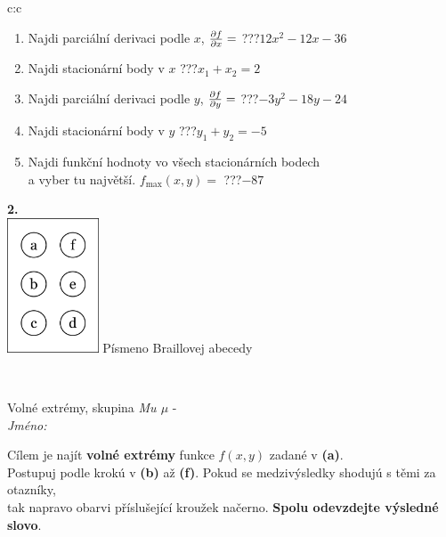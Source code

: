 \documentclass[10pt]{report}
\begin{document}
\begin{tabular}{c:c}
\begin{minipage}[c][104.5mm][t]{0.5\linewidth}
\begin{center}
\begin{minipage}{0.79\linewidth}
\begin{center}
\begin{varwidth}{\linewidth}
\begin{enumerate}
\item Najdi parciální derivaci podle $x$, $\pdv{f}{x}=$\quad \dotfill\; ???\;\dotfill \quad $12x^2-12x-36$
\item Najdi stacionární body v $x$\quad \dotfill\; ???\;\dotfill \quad $x_1+x_2=2$
\item Najdi parciální derivaci podle $y$, $\pdv{f}{y}=$\quad \dotfill\; ???\;\dotfill \quad $-3y^2-18y-24$
\item Najdi stacionární body v $y$\quad \dotfill\; ???\;\dotfill \quad $y_1+y_2=-5$
\item Najdi funkční hodnoty vo všech stacionárních bodech \\ \phantom{xxxxxx} a vyber tu najvětší. $f_{\text{max}}(x,y)=$\quad \dotfill\; ???\;\dotfill \quad $-87$
\end{enumerate}
\end{varwidth}
\end{center}
\end{minipage}
\begin{minipage}{0.20\linewidth}
\begin{center}
{\Huge\bfseries 2.} \\[2mm]
\includegraphics[height=40mm]{../images/braille.png}
{\small Písmeno Braillovej abecedy}
\end{center}
\end{minipage}
\end{center}
\end{minipage}
\\ \hdashline
\begin{minipage}[c][104.5mm][t]{0.5\linewidth}
\begin{center}
\vspace{7mm}
{\huge Volné extrémy, skupina \textit{Mu $\mu$} -}\\[5mm]
\textit{Jméno:}\phantom{xxxxxxxxxxxxxxxxxxxxxxxxxxxxxxxxxxxxxxxxxxxxxxxxxxxxxxxxxxxxxxxxx}\\[5mm]
\begin{minipage}{0.95\linewidth}
\begin{center}
Cílem je najít \textbf{volné extrémy} funkce $f(x,y)$ zadané v \textbf{(a)}.\\Postupuj podle krokú v \textbf{(b)} až \textbf{(f)}. Pokud se medzivýsledky shodujú s těmi za otazníky,\\tak napravo obarvi příslušející kroužek načerno. \textbf{Spolu odevzdejte výsledné slovo}.

\end{center}
\end{minipage}
\end{center}
\end{minipage}
\end{tabular}
\end{document}
